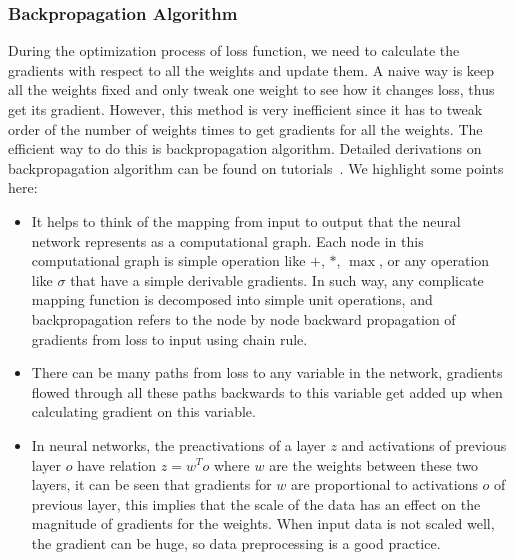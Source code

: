 \subsubsection{Backpropagation Algorithm}
During the optimization process of loss function, we need to calculate the gradients with respect to all the weights and update them. A naive way is keep all the weights fixed and only tweak one weight to see how it changes loss, thus get its gradient. However, this method is very inefficient since it has to tweak order of the number of weights times to get gradients for all the weights. The efficient way to do this is backpropagation algorithm. Detailed derivations on backpropagation algorithm can be found on tutorials~\cite{links:nielsennnbook, links:cs231n}. We highlight some points here:
\begin{itemize}
\item It helps to think of the mapping from input to output that the neural network represents as a computational graph. Each node in this computational graph is simple operation like $+$, $*$, $\max$, or any operation like $\sigma$ that have a simple derivable gradients. In such way, any complicate mapping function is decomposed into simple unit operations, and backpropagation refers to the node by node backward propagation of gradients from loss to input using chain rule.
\item There can be many paths from loss to any variable in the network, gradients flowed through all these paths backwards to this variable get added up when calculating gradient on this variable.
\item In neural networks, the preactivations of a layer $z$ and activations of previous layer $o$ have relation $z = w^To$ where $w$ are the weights between these two layers, it can be seen that gradients for $w$ are proportional to activations $o$ of previous layer, this implies that the scale of the data has an effect on the magnitude of gradients for the weights. When input data is not scaled well, the gradient can be huge, so data preprocessing is a good practice.
\end{itemize}

